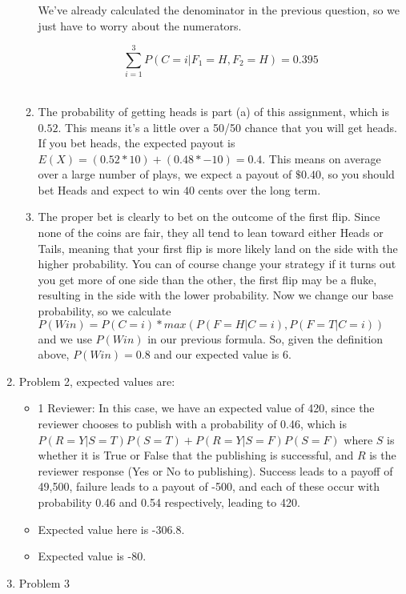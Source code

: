 \documentclass{article}
\begin{document}
\begin{enumerate}
\begin{enumerate}
				We've already calculated the denominator in the previous question, so we just have to worry about the numerators.
				
				$$\sum_{i=1}^{3}P(C=i | F_1=H, F_2=H) = 0.395$$\\
				
				\item The probability of getting heads is part (a) of this assignment, which is $0.52$.  This means it's a little over a 50/50 chance that you will get heads.  If you bet heads, the expected payout is $E(X) = (0.52 * 10) + (0.48 * -10) = 0.4$.  This means on average over a large number of plays, we expect a payout of $\$0.40$, so you should bet Heads and expect to win $40$ cents over the long term.
				
				\item The proper bet is clearly to bet on the outcome of the first flip.  Since none of the coins are fair, they all tend to lean toward either Heads or Tails, meaning that your first flip is more likely land on the side with the higher probability.  You can of course change your strategy if it turns out you get more of one side than the other, the first flip may be a fluke, resulting in the side with the lower probability.  Now we change our base probability, so we calculate $P(Win) = P(C=i) * max(P(F=H | C=i), P(F=T|C=i))$ and we use $P(Win)$ in our previous formula.  So, given the definition above, $P(Win) = 0.8$ and our expected value is 6.
			\end{enumerate}
		
		\item Problem 2, expected values are:
			\begin{itemize}
				\item 1 Reviewer: In this case, we have an expected value of 420, since the reviewer chooses to publish with a probability of 0.46, which is $P(R=Y|S=T)P(S=T) + P(R=Y|S=F)P(S=F)$ where $S$ is whether it is True or False that the publishing is successful, and $R$ is the reviewer response (Yes or No to publishing). Success leads to a payoff of 49,500, failure leads to a payout of -500, and each of these occur with probability 0.46 and 0.54 respectively, leading to 420.
				
				\item Expected value here is -306.8.
				
				\item Expected value is -80.
			\end{itemize}
		\item Problem 3
	\end{enumerate}
\end{document}
